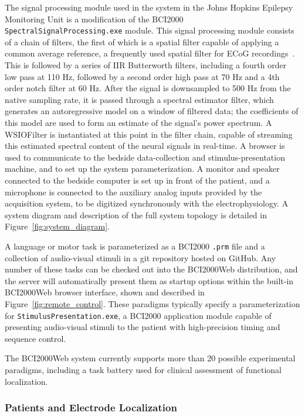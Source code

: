 \documentclass[utf8]{frontiersSCNS}
\begin{document}
The signal processing module used in the system in the Johns Hopkins Epilepsy Monitoring Unit is a modification of the BCI2000 \texttt{SpectralSignalProcessing.exe} module.
This signal processing module consists of a chain of filters, the first of which is a spatial filter capable of applying a common average reference, a frequently used spatial filter for ECoG recordings~\citep{liu_effects_2015}.
This is followed by a series of IIR Butterworth filters, including a fourth order low pass at 110 Hz, followed by a second order high pass at 70 Hz and a 4th order notch filter at 60 Hz.
After the signal is downsampled to 500 Hz from the native sampling rate, it is passed through a spectral estimator filter, which generates an autoregressive model on a window of filtered data; the coefficients of this model are used to form an estimate of the signal's power spectrum.
A WSIOFilter is instantiated at this point in the filter chain, capable of streaming this estimated spectral content of the neural signals in real-time.
A browser is used to communicate to the bedside data-collection and stimulus-presentation machine, and to set up the system parameterization.
A monitor and speaker connected to the bedside computer is set up in front of the patient, and a microphone is connected to the auxiliary analog inputs provided by the acquisition system, to be digitized synchronously with the electrophysiology.
A system diagram and description of the full system topology is detailed in Figure~\ref{fig:system_diagram}.

A language or motor task is parameterized as a BCI2000 \texttt{.prm} file and a collection of audio-visual stimuli in a git repository hosted on GitHub.
Any number of these tasks can be checked out into the BCI2000Web distribution, and the server will automatically present them as startup options within the built-in BCI2000Web browser interface, shown and described in Figure~\ref{fig:remote_control}.
These paradigms typically specify a parameterization for \texttt{StimulusPresentation.exe}, a BCI2000 application module capable of presenting audio-visual stimuli to the patient with high-precision timing and sequence control.

The BCI2000Web system currently supports more than 20 possible experimental paradigms, including a task battery used for clinical assessment of functional localization.

\subsubsection{Patients and Electrode Localization}
\end{document}

